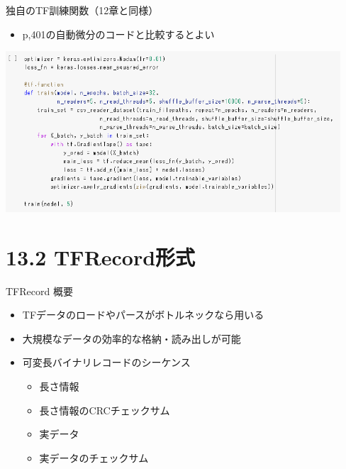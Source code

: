 \documentclass[aspectratio=169, dvipdfmx, 14pt, xcolor={svgnames,dvipsnames}, t]{beamer}
\begin{document}

\begin{frame}{独自のTF訓練関数（12章と同様）}

  \begin{itemize}
    \tightlist
    \item
          p,401の自動微分のコードと比較するとよい
  \end{itemize}

  \centering
  \includegraphics[height=170pt]{img/hands-on-ml_13-1-6_4.png}

\end{frame}


\hypertarget{tfrecordux5f62ux5f0f}{%
  \section{13.2 TFRecord形式}\label{tfrecordux5f62ux5f0f}}


\begin{frame}{TFRecord 概要}

  \begin{itemize}
    \tightlist
    \item
          TFデータのロードやパースがボトルネックなら用いる
    \item
          大規模なデータの効率的な格納・読み出しが可能
    \item
          可変長バイナリレコードのシーケンス

          \begin{itemize}
            \tightlist
            \item
                  長さ情報
            \item
                  長さ情報のCRCチェックサム
            \item
                  実データ
            \item
                  実データのチェックサム
          \end{itemize}
  \end{itemize}

\end{frame}
\end{document}
